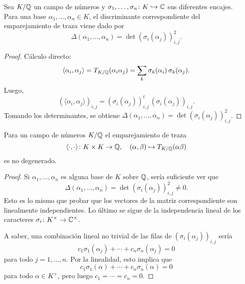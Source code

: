 \begin{lema}
  Sea $K/\mathbb{Q}$ un campo de números y
  $\sigma_1,\ldots,\sigma_n\colon K \hookrightarrow \mathbb{C}$ sus diferentes encajes.
  Para una base $\alpha_1,\ldots,\alpha_n \in K$, el discriminante
  correspondiente del emparejamiento de traza viene dado por
  $$\Delta (\alpha_1,\ldots,\alpha_n) = \det (\sigma_i (\alpha_j))_{i,j}^2.$$

  \begin{proof}
    Cálculo directo:
    \[ \langle\alpha_i,\alpha_j\rangle = T_{K/\mathbb{Q}} (\alpha_i \alpha_j) =
       \sum_k \sigma_k (\alpha_i)\,\sigma_k (\alpha_j). \]
    Luego,
    \[ (\langle\alpha_i,\alpha_j\rangle)_{i,j} =
       (\sigma_i (\alpha_j))_{i,j}^t\,(\sigma_i (\alpha_j))_{i,j}. \]
    Tomando los determinantes, se obtiene
    $\Delta (\alpha_1,\ldots,\alpha_n) = \det (\sigma_i (\alpha_j))_{i,j}^2$.
  \end{proof}
\end{lema}

\begin{proposicion}
  Para un campo de números $K/\mathbb{Q}$ el emparejamiento de traza
  \[ \langle\cdot,\cdot\rangle\colon K\times K \to \mathbb{Q}, \quad
     (\alpha,\beta) \mapsto T_{K/\mathbb{Q}} (\alpha\beta) \]
  es no degenerado.

  \begin{proof}
    Si $\alpha_1,\ldots,\alpha_n$ es alguna base de $K$ sobre $\mathbb{Q}$,
    sería suficiente ver que
    \[ \Delta (\alpha_1,\ldots,\alpha_n) =
       \det (\sigma_i (\alpha_j))_{i,j}^2 \ne 0. \]
    Esto es lo mismo que probar que los vectores de la matriz correspondiente
    son linealmente independientes. Lo último se sigue de la independencia
    lineal de los caracteres $\sigma_i\colon K^\times \to \mathbb{C}^\times$.

    A saber, una combinación lineal no trivial de las filas de
    $(\sigma_i (\alpha_j))_{i,j}$ sería
    $$c_1 \sigma_1 (\alpha_j) + \cdots + c_n \sigma_n (\alpha_j) = 0$$
    para todo $j = 1,\ldots,n$. Por la linealidad, esto implica que
    $$c_1 \sigma_1 (\alpha) + \cdots + c_n \sigma_n (\alpha) = 0$$
    para todo $\alpha \in K^\times$, pero luego
    $c_1 = \cdots = c_n = 0$.
  \end{proof}
\end{proposicion}

